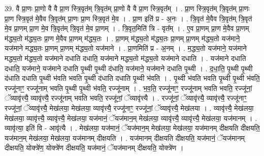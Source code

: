 \documentclass[17pt]{extarticle}
\begin{document}
39. वै प्रा॒णः प्रा॒णो वै वै प्रा॒ण स्त्रि॒वृत॑म् त्रि॒वृत॑म् प्रा॒णो वै वै प्रा॒ण स्त्रि॒वृत᳚म् । . प्रा॒ण स्त्रि॒वृत॑म् त्रि॒वृत॑म् प्रा॒णः प्रा॒ण स्त्रि॒वृत॑ मे॒वैव त्रि॒वृत॑म् प्रा॒णः प्रा॒ण स्त्रि॒वृत॑ मे॒व । . प्रा॒ण इति॑ प्र - अ॒नः । . त्रि॒वृत॑ मे॒वैव त्रि॒वृत॑म् त्रि॒वृत॑ मे॒व प्रा॒णम् प्रा॒ण मे॒व त्रि॒वृत॑म् त्रि॒वृत॑ मे॒व प्रा॒णम् । . त्रि॒वृत॒मिति॑ त्रि - वृत᳚म् । . ए॒व प्रा॒णम् प्रा॒ण मे॒वैव प्रा॒णम् म॑द्ध्य॒तो म॑द्ध्य॒तः प्रा॒ण मे॒वैव प्रा॒णम् म॑द्ध्य॒तः । . प्रा॒णम् म॑द्ध्य॒तो म॑द्ध्य॒तः प्रा॒णम् प्रा॒णम् म॑द्ध्य॒तो यज॑माने॒ यज॑माने मद्ध्य॒तः प्रा॒णम् प्रा॒णम् म॑द्ध्य॒तो यज॑माने । . प्रा॒णमिति॑ प्र - अ॒नम् । . म॒द्ध्य॒तो यज॑माने॒ यज॑माने मद्ध्य॒तो म॑द्ध्य॒तो यज॑माने दधाति दधाति॒ यज॑माने मद्ध्य॒तो म॑द्ध्य॒तो यज॑माने दधाति । . यज॑माने दधाति दधाति॒ यज॑माने॒ यज॑माने दधाति पृ॒थ्वी पृ॒थ्वी द॑धाति॒ यज॑माने॒ यज॑माने दधाति पृ॒थ्वी । . द॒धा॒ति॒ पृ॒थ्वी पृ॒थ्वी द॑धाति दधाति पृ॒थ्वी भ॑वति भवति पृ॒थ्वी द॑धाति दधाति पृ॒थ्वी भ॑वति । . पृ॒थ्वी भ॑वति भवति पृ॒थ्वी पृ॒थ्वी भ॑वति॒ रज्जू॑नाꣳ॒॒ रज्जू॑नाम् भवति पृ॒थ्वी पृ॒थ्वी भ॑वति॒ रज्जू॑नाम् । . भ॒व॒ति॒ रज्जू॑नाꣳ॒॒ रज्जू॑नाम् भवति भवति॒ रज्जू॑नां॒ ॅव्यावृ॑त्त्यै॒ व्यावृ॑त्त्यै॒ रज्जू॑नाम् भवति भवति॒ रज्जू॑नां॒ ॅव्यावृ॑त्त्यै । . रज्जू॑नां॒ ॅव्यावृ॑त्त्यै॒ व्यावृ॑त्त्यै॒ रज्जू॑नाꣳ॒॒ रज्जू॑नां॒ ॅव्यावृ॑त्त्यै॒ मेख॑लया॒ मेख॑लया॒ व्यावृ॑त्त्यै॒ रज्जू॑नाꣳ॒॒ रज्जू॑नां॒ ॅव्यावृ॑त्त्यै॒ मेख॑लया । . व्यावृ॑त्त्यै॒ मेख॑लया॒ मेख॑लया॒ व्यावृ॑त्त्यै॒ व्यावृ॑त्त्यै॒ मेख॑लया॒ यज॑मानं॒ ॅयज॑मान॒म् मेख॑लया॒ व्यावृ॑त्त्यै॒ व्यावृ॑त्त्यै॒ मेख॑लया॒ यज॑मानम् । . व्यावृ॑त्या॒ इति॑ वि - आवृ॑त्यै । . मेख॑लया॒ यज॑मानं॒ ॅयज॑मान॒म् मेख॑लया॒ मेख॑लया॒ यज॑मानम् दीक्षयति दीक्षयति॒ यज॑मान॒म् मेख॑लया॒ मेख॑लया॒ यज॑मानम् दीक्षयति । . यज॑मानम् दीक्षयति दीक्षयति॒ यज॑मानं॒ ॅयज॑मानम् दीक्षयति॒ योक्त्रे॑ण॒ योक्त्रे॑ण दीक्षयति॒ यज॑मानं॒ ॅयज॑मानम् दीक्षयति॒ योक्त्रे॑ण । \newline
\end{document}
